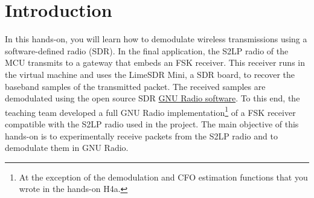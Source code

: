 \section*{Introduction}

In this hands-on, you will learn how to demodulate wireless transmissions using a software-defined radio (SDR).
In the final application, the S2LP radio of the MCU transmits to a gateway that embeds an FSK receiver.
This receiver runs in the virtual machine and uses the LimeSDR Mini, a SDR board, to recover the
baseband samples of the transmitted packet. The received samples are demodulated using the open source SDR \href{https://wiki.gnuradio.org/index.php/Main_Page}{GNU Radio software}.
To this end, the teaching team developed a full GNU Radio implementation\footnote{At the exception of the demodulation and CFO estimation functions that you wrote in the hands-on H4a.}
of a FSK receiver compatible with the S2LP radio used in the project.
The main objective of this hands-on is to experimentally receive packets from the S2LP radio and to demodulate them in GNU Radio.
